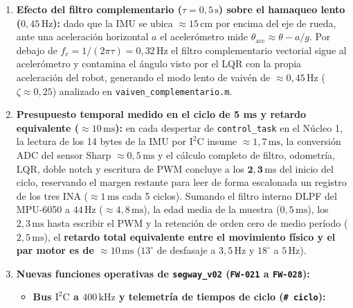 \documentclass[11pt,a4paper]{report}
\newcommand{\ud}[1]{\,\mathrm{#1}}
\begin{document}
\begin{enumerate}[leftmargin=1.6em]
      $17\text{--}21\ud{^\circ/s}$ a $10{,}4\ud{Hz}$. Se dispusieron entonces \textbf{dos filtros
      biquad rechaza banda (\emph{notch}) en cascada sobre $u$} antes del saturador: uno ancho en
      $\mathbf{11{,}6\ud{Hz}}$ ($Q = 0{,}7$) y otro selectivo en $\mathbf{7{,}7\ud{Hz}}$ ($Q = 2{,}0$),
      que redujeron la vibración angular doce veces (de $21\ud{^\circ/s}$ a $\mathbf{1{,}7\ud{^\circ/s}}$).
      El compromiso de fase asociado es de $-41^\circ$ a $3{,}5\ud{Hz}$, dejando el modo crítico
      de lazo cerrado en $\approx 5{,}3\ud{Hz}$.
\item \textbf{Efecto del filtro complementario ($\tau = 0{,}5\ud{s}$) sobre el hamaqueo lento ($0{,}45\ud{Hz}$):}
      dado que la IMU se ubica $\approx 15\ud{cm}$ por encima del eje de rueda, ante una
      aceleración horizontal $a$ el acelerómetro mide $\theta_{\text{acc}} \approx \theta - a/g$.
      Por debajo de $f_c = 1/(2\pi\tau) = 0{,}32\ud{Hz}$ el filtro complementario vectorial sigue
      al acelerómetro y contamina el ángulo visto por el LQR con la propia aceleración del
      robot, generando el modo lento de vaivén de $\approx 0{,}45\ud{Hz}$ ($\zeta \approx 0{,}25$)
      analizado en \texttt{vaiven\_complementario.m}.
\item \textbf{Presupuesto temporal medido en el ciclo de 5 ms y retardo equivalente ($\approx 10\ud{ms}$):}
      en cada despertar de \texttt{control\_task} en el Núcleo 1, la lectura de los 14 bytes de
      la IMU por $\text{I}^2\text{C}$ insume $\approx 1{,}7\ud{ms}$, la conversión ADC del sensor
      Sharp $\approx 0{,}5\ud{ms}$ y el cálculo completo de filtro, odometría, LQR, doble notch y
      escritura de PWM concluye a los $\mathbf{2{,}3\ud{ms}}$ del inicio del ciclo, reservando el
      margen restante para leer de forma escalonada un registro de los tres INA ($\approx 1\ud{ms}$
      cada 5 ciclos). Sumando el filtro interno DLPF del MPU-6050 a $44\ud{Hz}$ ($\approx 4{,}8\ud{ms}$),
      la edad media de la muestra ($0{,}5\ud{ms}$), los $2{,}3\ud{ms}$ hasta escribir el PWM y la
      retención de orden cero de medio período ($2{,}5\ud{ms}$), el \textbf{retardo total
      equivalente entre el movimiento físico y el par motor es de $\approx 10\ud{ms}$} ($13^\circ$
      de desfasaje a $3{,}5\ud{Hz}$ y $18^\circ$ a $5\ud{Hz}$).
\item \textbf{Nuevas funciones operativas de \texttt{segway\_v02} (\texttt{FW-021} a \texttt{FW-028}):}
      \begin{itemize}[leftmargin=1.4em]
      \item \textbf{Bus $\text{I}^2\text{C}$ a $400\ud{kHz}$ y telemetría de tiempos de ciclo (\texttt{\# ciclo}):}

\end{itemize}
\end{enumerate}
\end{document}
